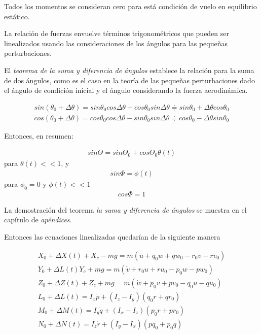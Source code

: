Todos los momentos se consideran cero para está condición de vuelo en equilibrio estático. 

La relación de fuerzas envuelve términos trigonométricos que pueden ser linealizados usando las consideraciones de los ángulos para las pequeñas perturbaciones. 

El \textit{teorema de la suma y diferencia de ángulos} establece la relación para la suma de dos ángulos, como es el caso en la teoría de las pequeñas perturbaciones dado el ángulo de condición inicial y el ángulo considerando la fuerza aerodinámica. 

\begin{gather}
    sin(\theta_0 + \Delta \theta) = sin \theta_0 cos \Delta \theta + cos \theta_0 sin \Delta \theta \doteqdot sin\theta_0 + \Delta \theta cos \theta_0 \\
    cos(\theta_0 + \Delta \theta) = cos \theta_0 cos \Delta \theta - sin \theta_0 sin \Delta \theta \doteqdot cos\theta_0 - \Delta \theta sin \theta_0
\end{gather}

Entonces, en resumen:

\begin{gather}
    sin\Theta = sin \Theta_0 + cos\Theta_0 \theta(t) 
\end{gather} 
para $\theta(t) << 1$, y
\begin{gather}
    sin\Phi = \phi(t)
\end{gather}
para $\phi_0 = 0$ y $\phi(t) << 1$
\begin{gather}
    cos \Phi = 1
\end{gather}

La demostración del teorema \textit{la suma y diferencia de ángulos} se muestra en el capítulo de \textit{apéndices}.

Entonces las ecuaciones linealizadas quedarían de la siguiente manera


\begin{gather}
    X_0 + \Delta X(t) + X_c - mg = m(\dot u + q_0 w + q w_0 - r_0 v - r v_0) \\
    Y_0 + \Delta L(t) Y_c + mg = m (\dot v + r_0 u + r u_0 - p_0 w - p w_0) \\
    Z_0 + \Delta Z(t) + Z_c + mg = m ( \dot w + p_0 v + p v_0 - q_0 u - q u_0) \\
    L_0 + \Delta L(t) = I_x \dot p + (I_z - I_y)(q_0 r + q r_0) \\
    M_0 + \Delta M(t) = I_y \dot q + (I_x - I_z) (p_0 r + p r_0) \\
    N_0 + \Delta N(t) = I_z \dot r + (I_y - I_x)(p q_0 + p_0 q)
\end{gather}

